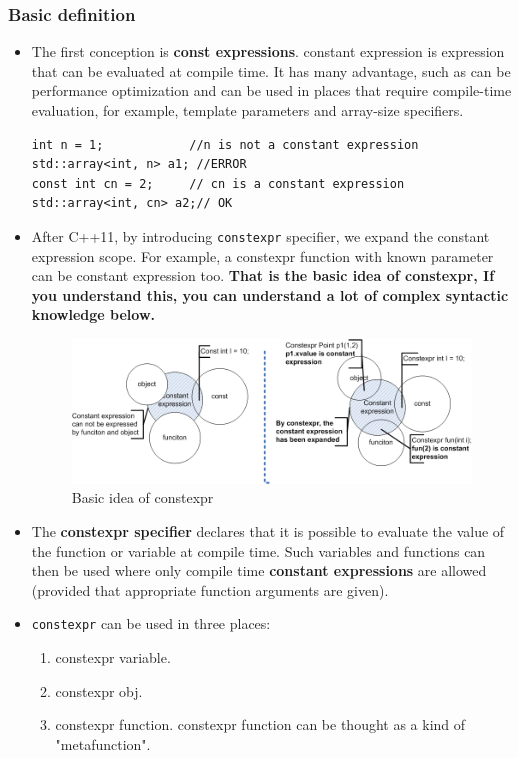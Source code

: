 \documentclass[a4paper,11pt,twoside]{book}
\begin{document}
\subsubsection{Basic definition}
\begin{itemize}
	
	\item The first conception is \textbf{const expressions}. constant expression is expression that can be evaluated at compile time. It has many advantage, such as can be performance optimization and can be used in places that require compile-time evaluation, for example, template parameters and array-size specifiers.
\begin{lstlisting}
int n = 1;            //n is not a constant expression
std::array<int, n> a1; //ERROR 
const int cn = 2;     // cn is a constant expression
std::array<int, cn> a2;// OK 
\end{lstlisting}
	
	\item After C++11, by introducing \texttt{constexpr} specifier, we expand the constant expression scope. For example, a constexpr function with known parameter can be constant expression too. \textbf{That is the basic idea of constexpr, If you understand this, you can understand a lot of complex syntactic knowledge below.}
	\begin{figure}[h]
		\centering
		\includegraphics[width=0.9\linewidth]{pics/constexpr.png}
		\caption{Basic idea of constexpr}
		\label{fig:constexpr}
	\end{figure}
	
	\item The \textbf{constexpr specifier} declares that it is possible to evaluate the value of the function or variable at compile time. Such variables and functions can then be used where only compile time \textbf{constant expressions} are allowed (provided that appropriate function arguments are given). 
	
	\item \texttt{constexpr} can be used in three places: 
	\begin{enumerate}
		\item constexpr variable.
		\item constexpr obj.
		\item constexpr function. constexpr function can be thought as a kind of "metafunction".
	\end{enumerate}
	

\end{itemize}
\end{document}
